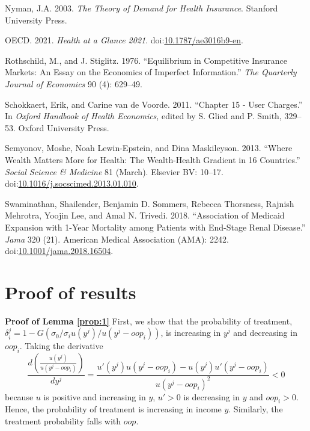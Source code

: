 \documentclass[a4paper,12pt]{article}
\begin{document}
\hypertarget{citeproc_bib_item_22}{Nyman, J.A. 2003. \textit{The Theory of Demand for Health Insurance}. Stanford University Press.}

\hypertarget{citeproc_bib_item_23}{OECD. 2021. \textit{Health at a Glance 2021}. doi:\href{https://doi.org/10.1787/ae3016b9-en}{10.1787/ae3016b9-en}.}

\hypertarget{citeproc_bib_item_24}{Rothschild, M., and J. Stiglitz. 1976. “Equilibrium in Competitive Insurance Markets: An Essay on the Economics of Imperfect Information.” \textit{The Quarterly Journal of Economics} 90 (4): 629–49.}

\hypertarget{citeproc_bib_item_25}{Schokkaert, Erik, and Carine van de Voorde. 2011. “Chapter 15 - User Charges.” In \textit{Oxford Handbook of Health Economics}, edited by S. Glied and P. Smith, 329–53. Oxford University Press.}

\hypertarget{citeproc_bib_item_26}{Semyonov, Moshe, Noah Lewin-Epstein, and Dina Maskileyson. 2013. “Where Wealth Matters More for Health: The Wealth-Health Gradient in 16 Countries.” \textit{Social Science \& Medicine} 81 (March). Elsevier BV: 10–17. doi:\href{https://doi.org/10.1016/j.socscimed.2013.01.010}{10.1016/j.socscimed.2013.01.010}.}

\hypertarget{citeproc_bib_item_27}{Swaminathan, Shailender, Benjamin D. Sommers, Rebecca Thorsness, Rajnish Mehrotra, Yoojin Lee, and Amal N. Trivedi. 2018. “Association of Medicaid Expansion with 1-Year Mortality among Patients with End-Stage Renal Disease.” \textit{Jama} 320 (21). American Medical Association (AMA): 2242. doi:\href{https://doi.org/10.1001/jama.2018.16504}{10.1001/jama.2018.16504}.}



\newpage
\appendix

\section{Proof of results}
\label{sec:org43d0193}

\textbf{Proof of Lemma \ref{prop:1}}
First, we show that the probability of treatment, \(\delta_i^j = 1-G(\sigma_0/\sigma_i u(y^j)/u(y^j-oop_{i}))\), is increasing in \(y^j\) and decreasing in \(oop_{i}\). Taking the derivative
\begin{equation}
\label{eq:treatment_y}
\frac{d \left( \frac{u(y^{j})}{u(y^{j}-oop_{i})} \right)}{dy^j} = \frac{u'(y^{j})u(y^j-oop_{i}) - u(y^{j})u'(y^{j}-oop_{i})}{u(y^j-oop_{i})^2} < 0
\end{equation}
because \(u\) is positive and increasing in \(y\), \(u'>0\) is decreasing in \(y\) and \(oop_{i} >0\). Hence, the probability of treatment is increasing in income \(y\). Similarly, the treatment probability falls with \(oop\).
\end{document}
